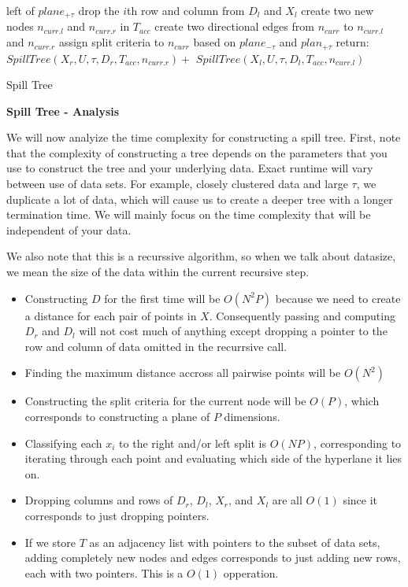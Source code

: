 \begin{algorithm}
{{{{                   \hspace{10pt} left of $plane_{+\tau}$ \;
                drop the $i$th row and column from $D_{l}$ and $X_{l}$ \;
            }
        }
        create two new nodes $n_{curr.l}$ and $n_{curr.r}$ in $T_{acc}$ \;
        create two directional edges from $n_{curr}$ to $n_{curr.l}$ and $n_{curr.r}$ \;
        assign split criteria to $n_{curr}$ based on $plane_{-\tau}$ and $plan_{+\tau}$
        return: $SpillTree(X_{r}, U, \tau, D_{r}, T_{acc}, n_{curr.r}) + $\; 
        \hspace{10pt} $SpillTree(X_{l}, U, \tau, D_{l}, T_{acc}, n_{curr.l})$
    }
}
\caption{Spill Tree\label{ST1}}
\end{algorithm}

\vspace{5 mm}
\noindent
\textbf{Spill Tree - Analysis}

\vspace{5 mm}
\noindent
We will now analyize the time complexity for constructing a spill tree. First, 
note that the complexity of constructing a tree depends on the parameters that 
you use to construct the tree and your underlying data. Exact runtime will 
vary between use of data sets. For example, closely clustered data and large 
$\tau$, we duplicate a lot of data, which will cause us to create a deeper tree 
with a longer termination time. We will mainly focus on the time complexity 
that will be independent of your data.

\vspace{5 mm}
\noindent
We also note that this is a recurssive algorithm, so when we talk about 
datasize, we mean the size of the data within the current recursive step.

\begin{itemize}
\item Constructing $D$ for the first time will be $O(N^{2} P)$ because we need 
to create a distance for each pair of points in $X$. Consequently passing and 
computing $D_{r}$ and $D_{l}$ will not cost much of anything except dropping a 
pointer to the row and column of data omitted in the recurrsive call.
\item Finding the maximum distance accross all pairwise points will be 
$O(N^{2})$
\item Constructing the split criteria for the current node will be $O(P)$, 
which corresponds to constructing a plane of $P$ dimensions.
\item Classifying each $x_{i}$ to the right and/or left split is $O(N P)$, 
corresponding to iterating through each point and evaluating which side of the 
hyperlane it lies on.
\item Dropping columns and rows of $D_{r}$, $D_{l}$, $X_{r}$, and $X_{l}$ are 
all $O(1)$ since it corresponds to just dropping pointers.
\item If we store $T$ as an adjacency list with pointers to the subset of data 
sets, adding completely new nodes and edges corresponds to just adding new rows, 
each with two pointers. This is a $O(1)$ opperation.
\end{itemize}

